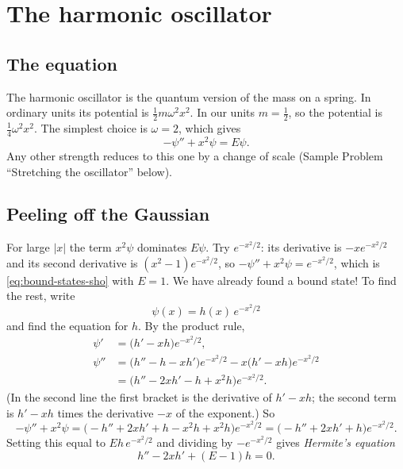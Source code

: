 \section{The harmonic oscillator}\label{sec:bound-states-sho}

\subsection{The equation}

The harmonic oscillator is the quantum version of the mass on a spring. In ordinary units its potential is $\tfrac12m\omega^2x^2$. In our units $m=\tfrac12$, so the potential is $\tfrac14\omega^2x^2$. The simplest choice is $\omega=2$, which gives
\begin{equation}
-\psi''+x^2\psi=E\psi .
\label{eq:bound-states-sho}
\end{equation}
Any other strength reduces to this one by a change of scale (Sample Problem ``Stretching the oscillator'' below).

\subsection{Peeling off the Gaussian}

For large $|x|$ the term $x^2\psi$ dominates $E\psi$. Try $e^{-x^2/2}$: its derivative is $-xe^{-x^2/2}$ and its second derivative is $(x^2-1)e^{-x^2/2}$, so $-\psi''+x^2\psi=e^{-x^2/2}$, which is \cref{eq:bound-states-sho} with $E=1$. We have already found a bound state! To find the rest, write
\begin{equation}
\psi(x)=h(x)\,e^{-x^2/2}
\label{eq:bound-states-hsub}
\end{equation}
and find the equation for $h$. By the product rule,
\begin{align*}
\psi'&=\bigl(h'-xh\bigr)e^{-x^2/2},\\
\psi''&=\bigl(h''-h-xh'\bigr)e^{-x^2/2}-x\bigl(h'-xh\bigr)e^{-x^2/2}\\
&=\bigl(h''-2xh'-h+x^2h\bigr)e^{-x^2/2}.
\end{align*}
(In the second line the first bracket is the derivative of $h'-xh$; the second term is $h'-xh$ times the derivative $-x$ of the exponent.) So
\[
-\psi''+x^2\psi=\bigl(-h''+2xh'+h-x^2h+x^2h\bigr)e^{-x^2/2}=\bigl(-h''+2xh'+h\bigr)e^{-x^2/2}.
\]
Setting this equal to $Eh\,e^{-x^2/2}$ and dividing by $-e^{-x^2/2}$ gives \emph{Hermite's equation}
\begin{equation}
h''-2xh'+(E-1)h=0 .
\label{eq:bound-states-hermite}
\end{equation}

